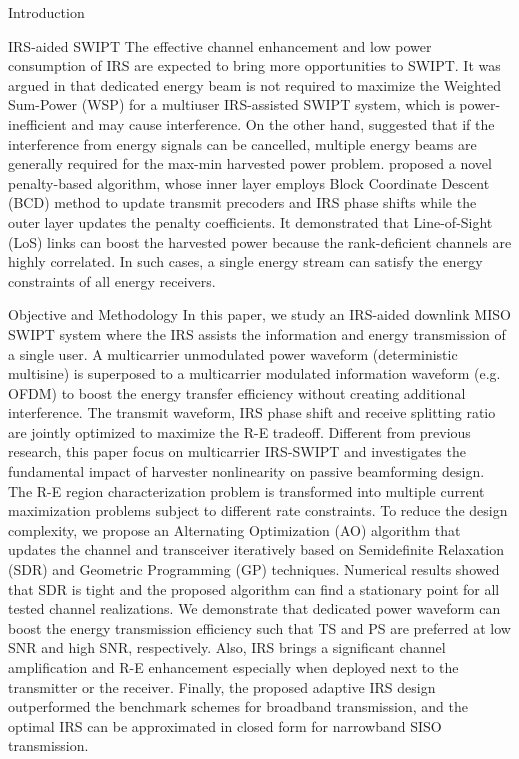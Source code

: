 \documentclass[journal]{IEEEtran}
\begin{document}
\begin{section}{Introduction}
		\begin{subsection}{IRS-aided SWIPT}
			The effective channel enhancement and low power consumption of IRS are expected to bring more opportunities to SWIPT. It was argued in \cite{Wu2019b} that dedicated energy beam is not required to maximize the Weighted Sum-Power (WSP) for a multiuser IRS-assisted SWIPT system, which is power-inefficient and may cause interference. On the other hand, \cite{Tang2019} suggested that if the interference from energy signals can be cancelled, multiple energy beams are generally required for the max-min harvested power problem. \cite{Wu2019c} proposed a novel penalty-based algorithm, whose inner layer employs Block Coordinate Descent (BCD) method to update transmit precoders and IRS phase shifts while the outer layer updates the penalty coefficients. It demonstrated that Line-of-Sight (LoS) links can boost the harvested power because the rank-deficient channels are highly correlated. In such cases, a single energy stream can satisfy the energy constraints of all energy receivers.
		\end{subsection}


		\begin{subsection}{Objective and Methodology}
			In this paper, we study an IRS-aided downlink MISO SWIPT system where the IRS assists the information and energy transmission of a single user. A multicarrier unmodulated power waveform (deterministic multisine) is superposed to a multicarrier modulated information waveform (e.g. OFDM) to boost the energy transfer efficiency without creating additional interference. The transmit waveform, IRS phase shift and receive splitting ratio are jointly optimized to maximize the R-E tradeoff. Different from previous research, this paper focus on multicarrier IRS-SWIPT and investigates the fundamental impact of harvester nonlinearity on passive beamforming design. The R-E region characterization problem is transformed into multiple current maximization problems subject to different rate constraints. To reduce the design complexity, we propose an Alternating Optimization (AO) algorithm that updates the channel and transceiver iteratively based on Semidefinite Relaxation (SDR) and Geometric Programming (GP) techniques. Numerical results showed that SDR is tight and the proposed algorithm can find a stationary point for all tested channel realizations. We demonstrate that dedicated power waveform can boost the energy transmission efficiency such that TS and PS are preferred at low SNR and high SNR, respectively. Also, IRS brings a significant channel amplification and R-E enhancement especially when deployed next to the transmitter or the receiver. Finally, the proposed adaptive IRS design outperformed the benchmark schemes for broadband transmission, and the optimal IRS can be approximated in closed form for narrowband SISO transmission.


\end{subsection}
\end{section}
\end{document}
